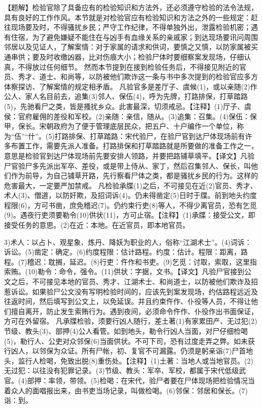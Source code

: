 \documentclass[12pt,UTF8]{ctexbook}
\begin{document}
【题解】检验官除了具备应有的检验知识和方法外，还必须遵守检验的法令法规，具有良好的工作作风。本节就是对检验官应有检验知识和方法之外的一些规定：赶往现场要及时，不得骚扰乡民；严守工作纪律，不得单独外出，泄露检验机密；遇有住宿，为了避免嫌疑不能住在与凶手有血缘关系的亲戚家；到达现场要讯问周围邻居以及见证人，了解案情：对于家属的请求和供词，要慎之又慎，以防家属被买通串供；要及时收缴凶器，比对伤痕大小；检验尸体时要细察案发现场，仔细认真，不得放过任何细节。
然而本节提到在接到检验任务后，不得接见附近的官员、秀才、道士、和尚等，以防被他们欺诈这一条与书中多次提到的检验官应多方体察探访、了解案情的规定相矛盾。
凡验官多是差厅子、虞候(1)，或以亲随(2)作公人、家人名目前去，追集(3)邻人、保伍(4)，呼为先牌，打路排保，打草踏路(5)，先驰看尸之类，皆是搔扰乡众。此害最深，切须戒忌。【注释】(1)厅子、虞侯：官府雇佣的差役和军校。(2)亲随：亲信，随从。(3)追集：召集。(4)保伍：保甲，保长。宋朝政府为了便于管理底层民众，把五户、十户编作一个单位，称为“伍”“什”。(5)打路排保、打草踏路：宋代验尸，在验尸官到达尸体现场前有许多布置工作，需要先派人准备。打路排保和打草踏路就是所要做的准备工作之一，意思是检验官到达尸体现场前先要安排人领路，并要把路铺草填平。【译文】凡验尸官验尸多先派出军卒、差役，或是带上侍从、家丁，然后召集邻人、保长，叫他们作为前导，为自己铺草开路，先行察看尸体之类，都是骚扰乡民的行为。这样的危害最大，一定要严加禁戒。
凡检验承牒(1)之后，不可接见在近(2)官员、秀才、术人(3)、僧道，以防奸欺，及招词诉(4)。仍未得凿定(5)日时于牒。前到地头约度程限(6)，方可书凿，庶免稽迟(7)。仍约束行吏(8)等人，不得少离官员，恐有乞觅(9)。遇夜行吏须要勒令(10)供状(11)，方可止宿。【注释】(1)承牒：接受公文，即接受任务的意思。(2)在近：本地。在近官员，即本地官员。

3)术人：以占卜、观星象、炼丹、降妖为职业的人，俗称“江湖术士”。(4)词诉：诉讼。(5)凿定：确定。(6)约度程限：估计路程。约度：估计。程限：距离，路程。(7)稽迟：耽搁，延迟。(8)行吏：仵作和书吏。(9)乞觅：讨取，索取，这里指索贿。(10)勒令：命令，强令。(11)供状：字据，文书。【译文】凡验尸官接到公文之后，不可接见本地的官员、秀才、江湖术士、和尚道士，以防被他们欺诈及招惹诉讼。如果验尸公文没有写明检验时间的，应该先到案发现场，约估路程远近及往返时间，然后填写到公文上，以免延误。并且约束仵作、仆役等人员，不得让他们擅自离开，防止发生索贿行为。遇到夜间，必须命令仵作、仆役作出书面保证，方可在外留宿。
凡承牒检验，须要行凶人随行，差土著(1)有家累田产、无过犯(2)节级、教头(3)、部押(4)公人看管。如到地头，勒令行凶人当面，对尸仔细检喝(5)，勒行人、公吏对众邻保(6)当面供状。不可下司，恐有过度走弄之弊。如未获行凶人，以邻保为众证。所有尸帐，初、复官不可漏露。仍须是躬亲诣(7)尸首地头，监行人检喝，免致出脱(8)重伤处。【注释】(1)土著：当地人或当地官员。(2)无过犯：以往没有犯罪记录。(3)节级、教头：军卒、军校，都属于宋代低级武官。(4)部押：率领，带领。(5)检喝：在宋代，验尸者要在尸体现场把检验情况当着众人的面唱报出来，由书吏当场记录，叫做检喝。(6)邻保：邻居和保长。(7)诣：到。
\end{document}
